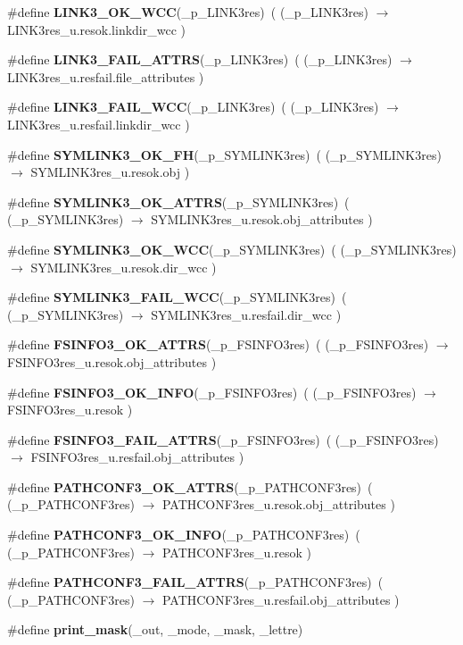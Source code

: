 \begin{CompactItemize}
\item 
\#define {\bf LINK3\_\-OK\_\-WCC}(\_\-p\_\-LINK3res)\ ( (\_\-p\_\-LINK3res) $\rightarrow$ LINK3res\_\-u.resok.linkdir\_\-wcc )
\item 
\#define {\bf LINK3\_\-FAIL\_\-ATTRS}(\_\-p\_\-LINK3res)\ ( (\_\-p\_\-LINK3res) $\rightarrow$ LINK3res\_\-u.resfail.file\_\-attributes )
\item 
\#define {\bf LINK3\_\-FAIL\_\-WCC}(\_\-p\_\-LINK3res)\ ( (\_\-p\_\-LINK3res) $\rightarrow$ LINK3res\_\-u.resfail.linkdir\_\-wcc )
\item 
\#define {\bf SYMLINK3\_\-OK\_\-FH}(\_\-p\_\-SYMLINK3res)\ ( (\_\-p\_\-SYMLINK3res) $\rightarrow$ SYMLINK3res\_\-u.resok.obj )
\item 
\#define {\bf SYMLINK3\_\-OK\_\-ATTRS}(\_\-p\_\-SYMLINK3res)\ ( (\_\-p\_\-SYMLINK3res) $\rightarrow$ SYMLINK3res\_\-u.resok.obj\_\-attributes )
\item 
\#define {\bf SYMLINK3\_\-OK\_\-WCC}(\_\-p\_\-SYMLINK3res)\ ( (\_\-p\_\-SYMLINK3res) $\rightarrow$ SYMLINK3res\_\-u.resok.dir\_\-wcc )
\item 
\#define {\bf SYMLINK3\_\-FAIL\_\-WCC}(\_\-p\_\-SYMLINK3res)\ ( (\_\-p\_\-SYMLINK3res) $\rightarrow$ SYMLINK3res\_\-u.resfail.dir\_\-wcc )
\item 
\#define {\bf FSINFO3\_\-OK\_\-ATTRS}(\_\-p\_\-FSINFO3res)\ ( (\_\-p\_\-FSINFO3res) $\rightarrow$ FSINFO3res\_\-u.resok.obj\_\-attributes )
\item 
\#define {\bf FSINFO3\_\-OK\_\-INFO}(\_\-p\_\-FSINFO3res)\ ( (\_\-p\_\-FSINFO3res) $\rightarrow$ FSINFO3res\_\-u.resok )
\item 
\#define {\bf FSINFO3\_\-FAIL\_\-ATTRS}(\_\-p\_\-FSINFO3res)\ ( (\_\-p\_\-FSINFO3res) $\rightarrow$ FSINFO3res\_\-u.resfail.obj\_\-attributes )
\item 
\#define {\bf PATHCONF3\_\-OK\_\-ATTRS}(\_\-p\_\-PATHCONF3res)\ ( (\_\-p\_\-PATHCONF3res) $\rightarrow$ PATHCONF3res\_\-u.resok.obj\_\-attributes )
\item 
\#define {\bf PATHCONF3\_\-OK\_\-INFO}(\_\-p\_\-PATHCONF3res)\ ( (\_\-p\_\-PATHCONF3res) $\rightarrow$ PATHCONF3res\_\-u.resok )
\item 
\#define {\bf PATHCONF3\_\-FAIL\_\-ATTRS}(\_\-p\_\-PATHCONF3res)\ ( (\_\-p\_\-PATHCONF3res) $\rightarrow$ PATHCONF3res\_\-u.resfail.obj\_\-attributes )
\item 
\#define {\bf print\_\-mask}(\_\-out, \_\-mode, \_\-mask, \_\-lettre)
\end{CompactItemize}
